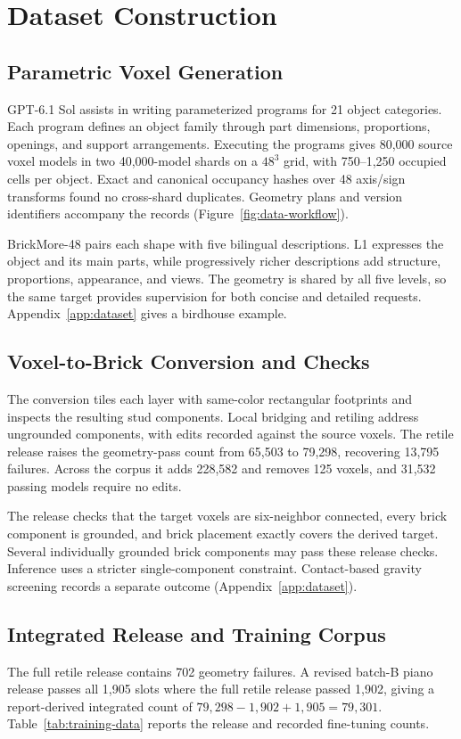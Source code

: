 \documentclass[letterpaper]{article} %
\begin{document}
\section{Dataset Construction}
\label{sec:dataset}
\subsection{Parametric Voxel Generation}
GPT-6.1 Sol assists in writing parameterized programs for 21 object categories. Each program defines an object family through part dimensions, proportions, openings, and support arrangements. Executing the programs gives 80,000 source voxel models in two 40,000-model shards on a $48^3$ grid, with 750--1,250 occupied cells per object. Exact and canonical occupancy hashes over 48 axis/sign transforms found no cross-shard duplicates. Geometry plans and version identifiers accompany the records (Figure~\ref{fig:data-workflow}).

BrickMore-48 pairs each shape with five bilingual descriptions. L1 expresses the object and its main parts, while progressively richer descriptions add structure, proportions, appearance, and views. The geometry is shared by all five levels, so the same target provides supervision for both concise and detailed requests. Appendix~\ref{app:dataset} gives a birdhouse example.

\subsection{Voxel-to-Brick Conversion and Checks}
The conversion tiles each layer with same-color rectangular footprints and inspects the resulting stud components. Local bridging and retiling address ungrounded components, with edits recorded against the source voxels. The retile release raises the geometry-pass count from 65,503 to 79,298, recovering 13,795 failures. Across the corpus it adds 228,582 and removes 125 voxels, and 31,532 passing models require no edits.

The release checks that the target voxels are six-neighbor connected, every brick component is grounded, and brick placement exactly covers the derived target. Several individually grounded brick components may pass these release checks. Inference uses a stricter single-component constraint. Contact-based gravity screening records a separate outcome (Appendix~\ref{app:dataset}).

\subsection{Integrated Release and Training Corpus}
The full retile release contains 702 geometry failures. A revised batch-B piano release passes all 1,905 slots where the full retile release passed 1,902, giving a report-derived integrated count of $79{,}298-1{,}902+1{,}905=79{,}301$. Table~\ref{tab:training-data} reports the release and recorded fine-tuning counts.

\end{document}
